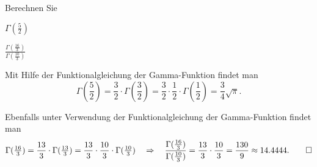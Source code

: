 Berechnen Sie
\begin{teilaufgaben}
\item $\Gamma(\frac{5}2)$
\item $\displaystyle \frac{\Gamma(\frac{16}3)}{\Gamma(\frac{10}3)}$
\end{teilaufgaben}

\begin{loesung}
\begin{teilaufgaben}
\item
Mit Hilfe der Funktionalgleichung der Gamma-Funktion findet man
\[
\Gamma({\textstyle\frac52})
=
\frac32
\cdot
\Gamma({\textstyle\frac32})
=
\frac32
\cdot
\frac12
\cdot
\Gamma({\textstyle\frac12})
=
\frac{3}{4}\sqrt{\pi}.
\]
\item
Ebenfalls unter Verwendung der Funktionalgleichung der Gamma-Funktion 
findet man
\[
\Gamma({\textstyle\frac{16}3})
=
\frac{13}3
\cdot
\Gamma({\textstyle\frac{13}3})
=
\frac{13}3
\cdot
\frac{10}3
\cdot
\Gamma({\textstyle\frac{10}3})
\quad\Rightarrow\quad
\frac{\Gamma(\frac{16}3)}{\Gamma(\frac{10}3)}
=
\frac{13}3\cdot\frac{10}3
=
\frac{130}{9}
\approx
14.4444.
\qedhere
\]
\end{teilaufgaben}
\end{loesung}
